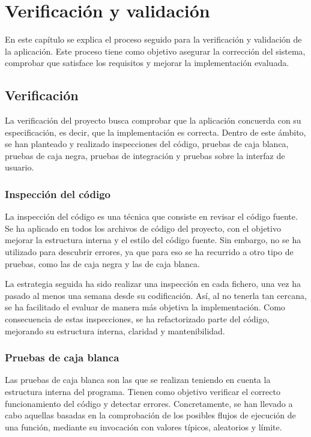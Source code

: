 \chapter{Verificación y validación\label{cap:pruebas}}

En este capítulo se explica el proceso seguido para la verificación y validación de la aplicación.
Este proceso tiene como objetivo asegurar la corrección del sistema, comprobar que satisface los requisitos y mejorar la implementación evaluada.

\section{Verificación\label{sec:pb:verificacion}}

La verificación del proyecto busca comprobar que la aplicación concuerda con su especificación, es decir, que la implementación es correcta.
Dentro de este ámbito, se han planteado y realizado inspecciones del código, pruebas de caja blanca, pruebas de caja negra, pruebas de integración y pruebas sobre la interfaz de usuario.

\subsection*{Inspección del código\label{ssec:pb:inspeccion}}

La inspección del código es una técnica que consiste en revisar el código fuente.
Se ha aplicado en todos los archivos de código del proyecto, con el objetivo mejorar la estructura interna y el estilo del código fuente.
Sin embargo, no se ha utilizado para descubrir errores, ya que para eso se ha recurrido a otro tipo de pruebas, como las de caja negra y las de caja blanca.

La estrategia seguida ha sido realizar una inspección en cada fichero, una vez ha pasado al menos una semana desde su codificación.
Así, al no tenerla tan cercana, se ha facilitado el evaluar de manera más objetiva la implementación.
Como consecuencia de estas inspecciones, se ha refactorizado parte del código, mejorando su estructura interna, claridad y mantenibilidad.

\subsection*{Pruebas de caja blanca\label{ssec:pb:caja_blanca}}

Las pruebas de caja blanca son las que se realizan teniendo en cuenta la estructura interna del programa.
Tienen como objetivo verificar el correcto funcionamiento del código y detectar errores.
Concretamente, se han llevado a cabo aquellas basadas en la comprobación de los posibles flujos de ejecución de una función, mediante su invocación con valores típicos, aleatorios y límite.

